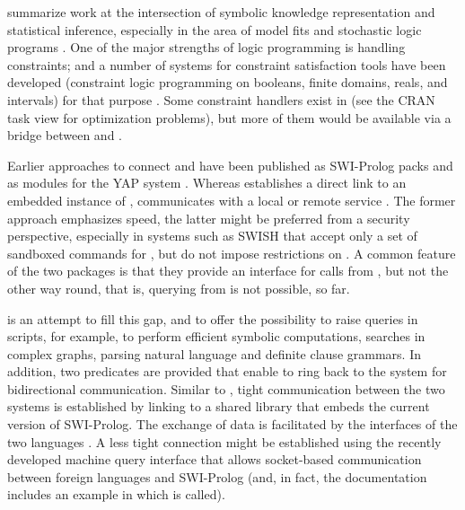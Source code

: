 \documentclass[article]{jss}
\begin{document}
\citet{Angelopoulos2013} summarize work at the
intersection of symbolic knowledge representation and statistical inference,
especially in the area of model
fits \citep[EM algorithms, MCMC]{Sato2001,Angelopoulos2008} and stochastic logic
programs \citep{Cussens2000,Kimmig2011}. One of the major strengths of logic
programming is handling constraints; and a number of systems for constraint
satisfaction tools have been developed (constraint logic programming on
booleans, finite domains, reals, and intervals) for that
purpose \citep[e.g.,][]{Fruehwirth1998,Triska2018}. Some constraint handlers
exist in  (see the CRAN task view for optimization problems), but
more of them would be available via a bridge between 
and . 

Earlier approaches to connect  and  have been
published as SWI-Prolog
packs \citep[real, rserve-client][]{Angelopoulos2013,Rserve} and as modules for
the YAP system \citep{YapR}. Whereas  establishes a direct link
to an embedded instance of ,  communicates with a
local or remote  service \citep{Urbanek2021}. The former approach
emphasizes speed, the latter might be preferred from a security perspective,
especially in systems such as SWISH \citep{SWISH} that accept only a set of
sandboxed commands for , but do not impose restrictions
on . A common feature of the two packages is that they provide an
interface for  calls from , but not the other way
round, that is, querying  from  is not possible, so
far.

 is an attempt to fill this gap, and to offer the possibility to raise
 queries in  scripts, for example, to perform
efficient symbolic computations, searches in complex graphs, parsing natural
language and definite clause grammars. In addition, two 
predicates are provided that enable  to ring back to
the  system for bidirectional communication. Similar to , 
tight communication between the two systems is established by linking to a
shared library that embeds the current version of SWI-Prolog. The exchange of
data is facilitated by the  interfaces of the two
languages \citep{Edelbuettel2018,Wielemaker2021}. A less tight connection might
be established using the recently developed machine query
interface \citep[MQI]{Zinda2021} that allows socket-based communication between
foreign languages and SWI-Prolog (and, in fact, the  documentation
includes an example in which  is called).
\end{document}
